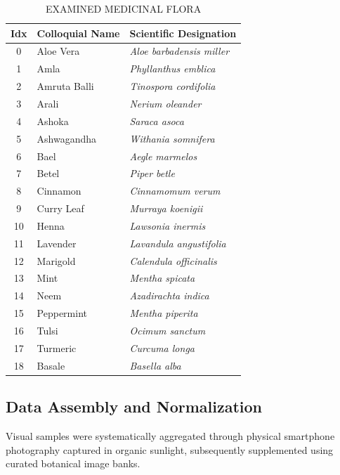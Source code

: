 \documentclass[conference]{IEEEtran}
\begin{document}
\begin{table}[htbp]
\caption{EXAMINED MEDICINAL FLORA}
\label{tab:plants}
\centering
\small
\begin{tabular}{|c|l|l|}
\hline
\textbf{Idx} & \textbf{Colloquial Name} & \textbf{Scientific Designation} \\
\hline
0  & Aloe Vera    & \textit{Aloe barbadensis miller} \\
1  & Amla         & \textit{Phyllanthus emblica} \\
2  & Amruta Balli & \textit{Tinospora cordifolia} \\
3  & Arali        & \textit{Nerium oleander} \\
4  & Ashoka       & \textit{Saraca asoca} \\
5  & Ashwagandha  & \textit{Withania somnifera} \\
6  & Bael         & \textit{Aegle marmelos} \\
7  & Betel        & \textit{Piper betle} \\
8  & Cinnamon     & \textit{Cinnamomum verum} \\
9  & Curry Leaf   & \textit{Murraya koenigii} \\
10 & Henna        & \textit{Lawsonia inermis} \\
11 & Lavender     & \textit{Lavandula angustifolia} \\
12 & Marigold     & \textit{Calendula officinalis} \\
13 & Mint         & \textit{Mentha spicata} \\
14 & Neem         & \textit{Azadirachta indica} \\
15 & Peppermint   & \textit{Mentha piperita} \\
16 & Tulsi        & \textit{Ocimum sanctum} \\
17 & Turmeric     & \textit{Curcuma longa} \\
18 & Basale       & \textit{Basella alba} \\
\hline
\end{tabular}
\end{table}

\subsection{Data Assembly and Normalization}

Visual samples were systematically aggregated through physical smartphone photography captured in organic sunlight, subsequently supplemented using curated botanical image banks. 
\end{document}
